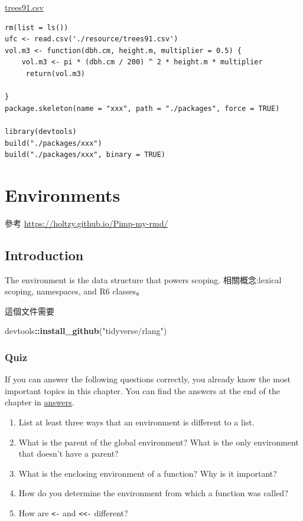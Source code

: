 \documentclass[]{book}
\newenvironment{Shaded}{\begin{snugshade}}{\end{snugshade}}
\newcommand{\KeywordTok}[1]{\textcolor[rgb]{0.13,0.29,0.53}{\textbf{#1}}}
\newcommand{\StringTok}[1]{\textcolor[rgb]{0.31,0.60,0.02}{#1}}
\newcommand{\OperatorTok}[1]{\textcolor[rgb]{0.81,0.36,0.00}{\textbf{#1}}}
\newcommand{\NormalTok}[1]{#1}
\theoremstyle{definition}
\theoremstyle{definition}
\theoremstyle{definition}
\theoremstyle{remark}
\begin{document}
\href{./resources/trees91.csv}{trees91.csv}

\begin{verbatim}
rm(list = ls())
ufc <- read.csv('./resource/trees91.csv')
vol.m3 <- function(dbh.cm, height.m, multiplier = 0.5) {
    vol.m3 <- pi * (dbh.cm / 200) ^ 2 * height.m * multiplier
     return(vol.m3)
    
}
package.skeleton(name = "xxx", path = "./packages", force = TRUE)

library(devtools)
build("./packages/xxx")
build("./packages/xxx", binary = TRUE)
\end{verbatim}

\hypertarget{environments}{\chapter{Environments}\label{environments}}

參考 \url{https://holtzy.github.io/Pimp-my-rmd/}

\section{Introduction}\label{introduction-1}

The environment is the data structure that powers scoping.
相關概念:lexical scoping, namespaces, and R6 classes。

這個文件需要

\begin{Shaded}
\begin{Highlighting}[]
\NormalTok{devtools}\OperatorTok{::}\KeywordTok{install_github}\NormalTok{(}\StringTok{"tidyverse/rlang"}\NormalTok{)}
\end{Highlighting}
\end{Shaded}

\subsection*{Quiz}\label{quiz}

If you can answer the following questions correctly, you already know
the most important topics in this chapter. You can find the answers at
the end of the chapter in \protect\hyperlink{env-answers}{answers}.

\begin{enumerate}
\def\labelenumi{\arabic{enumi}.}
\item
  List at least three ways that an environment is different to a list.
\item
  What is the parent of the global environment? What is the only
  environment that doesn't have a parent?
\item
  What is the enclosing environment of a function? Why is it important?
\item
  How do you determine the environment from which a function was called?
\item
  How are \texttt{\textless{}-} and \texttt{\textless{}\textless{}-}
  different?
\end{enumerate}
\end{document}
